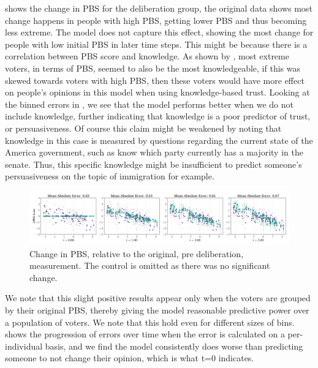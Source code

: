  shows the change in  PBS for the deliberation group,
the original data shows most change happens in people with high  PBS,
getting lower PBS and thus becoming less extreme. The model does not capture
this effect, showing the most change for people with low initial  PBS in
later time steps. This might be because there is a correlation between PBS
score and knowledge. As shown by \citet{fishkinCanDeliberationHave2024}, most
extreme voters, in terms of PBS, seemed to also be the most knowledgeable, if
this was skewed towards voters with high PBS, then these voters would have more
effect on people's opinions in this model when using knowledge-based trust.
Looking at the binned errors in , we see that the model
performs better when we do not include knowledge, further indicating that
knowledge is a poor predictor of trust, or persuasiveness. Of course this claim
might be weakened by noting that knowledge in this case is measured by
questions regarding the current state of the America government, such as know
which party currently has a majority in the senate. Thus, this specific
knowledge might be insufficient to predict someone's persuasiveness on the
topic of immigration for example.


\begin{figure}[h]
	\begin{center}
		\includegraphics[width=\textwidth]{Figures/change_pbs_scores.png}
	\end{center}
	\caption{Change in  PBS, relative to the original, pre deliberation, measurement. The control is  omitted as there was no significant change.}\label{fig:delta_pbs}
\end{figure}


We note that this slight positive results appear only when the voters are
grouped by their original PBS, thereby giving the model reasonable predictive
power over a population of voters. We note that this hold even for different
sizes of bins.  shows the progression of errors over
time when the error is calculated on a per-individual basis, and we find the
model consistently does worse than predicting someone to not change their
opinion, which is what t=0 indicates.

